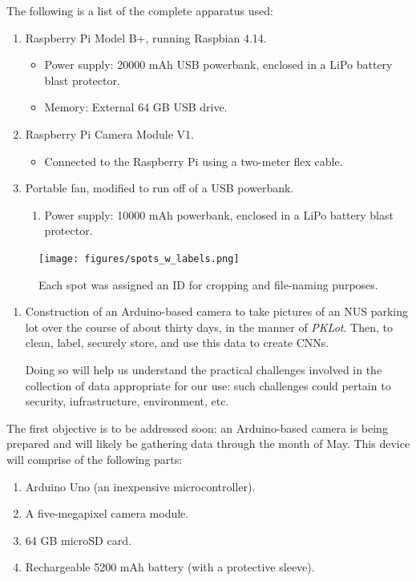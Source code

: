 \documentclass[a4paper, 11pt]{article} %
\begin{document}
	The following is a list of the complete apparatus used:
	\begin{enumerate}
		\item Raspberry Pi Model B+, running Raspbian 4.14.
		\begin{itemize}
			\item[] Power supply: 20000 mAh USB powerbank, enclosed in a LiPo battery blast protector.
			\item[] Memory: External 64 GB USB drive.
		\end{itemize}
		\item Raspberry Pi Camera Module V1.
		\begin{itemize}
			\item[] Connected to the Raspberry Pi using a two-meter flex cable.
		\end{itemize}
		\item Portable fan, modified to run off of a USB powerbank.
		\begin{enumerate}
			\item[] Power supply: 10000 mAh powerbank, enclosed in a LiPo battery blast protector.
		\end{enumerate}
	\end{enumerate}


	\begin{figure}[H]
		\centering
		\texttt{[image: figures/spots\_w\_labels.png]}
		\caption{Each spot was assigned an ID for cropping and file-naming purposes.}
	\end{figure}

\begin{enumerate}
	\item Construction of an Arduino-based camera to take pictures of an NUS parking lot over the 
	course of about thirty days, in the manner of \textit{PKLot}. Then, to clean, label, securely store, 
	and use this data to create CNNs.
	\begin{adjustwidth}{6mm}{}
		Doing so will help us understand the practical challenges involved in the collection of  
		data appropriate for our use: such challenges could pertain to security, infrastructure, 
		environment,  etc.
	\end{adjustwidth}
\end{enumerate}
\newpage
The first objective is to be addressed soon: an Arduino-based camera is being prepared and will 
likely be gathering data through the month of May. This device will comprise of the following parts:
\begin{enumerate}
	\item Arduino Uno (an inexpensive microcontroller).
	\item A five-megapixel camera module.
	\item 64 GB microSD card.
	\item Rechargeable 5200 mAh battery (with a protective sleeve).
\end{enumerate}
\end{document}
